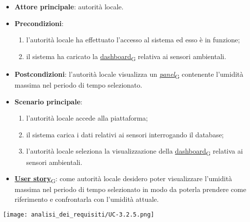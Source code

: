 \begin{itemize}
	\item \textbf{Attore principale}: autorità locale.
	\item \textbf{Precondizioni}:
	      \begin{enumerate}
		      \item l'autorità locale ha effettuato l'accesso al sistema ed esso è in funzione;
		      \item il sistema ha caricato la \href{https://7last.github.io/docs/pb/documentazione-interna/glossario\#dashboard}{dashboard\textsubscript{G}} relativa ai sensori ambientali.
	      \end{enumerate}
	\item \textbf{Postcondizioni}: l'autorità locale visualizza un \href{https://7last.github.io/docs/pb/documentazione-interna/glossario\#panel}{\textit{panel}\textsubscript{G}} contenente l'umidità massima nel periodo di tempo selezionato.
	\item \textbf{Scenario principale}:
	      \begin{enumerate}
		      \item l'autorità locale accede alla piattaforma;
		      \item il sistema carica i dati relativi ai sensori interrogando il database;
		      \item l'autorità locale seleziona la visualizzazione della \href{https://7last.github.io/docs/pb/documentazione-interna/glossario\#dashboard}{dashboard\textsubscript{G}} relativa ai sensori ambientali.
	      \end{enumerate}
	\item \href{https://7last.github.io/docs/pb/documentazione-interna/glossario\#user-story}{\textbf{User story}\textsubscript{G}}:
	      come autorità locale desidero poter visualizzare l'umidità massima nel periodo di tempo selezionato
	      in modo da poterla prendere come riferimento e confrontarla con l'umidità attuale.
\end{itemize}
\begin{center}
	\texttt{[image: analisi\_dei\_requisiti/UC-3.2.5.png]}
\end{center}


